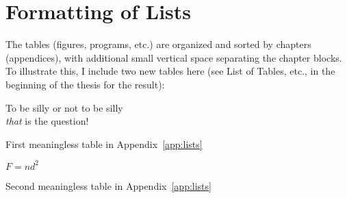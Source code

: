 \section{Formatting of Lists}

The tables (figures, programs, etc.) are organized and sorted by
chapters (appendices), with additional small vertical space separating
the chapter blocks. To illustrate this, I include two new tables here
(see List of Tables, etc., in the beginning of the thesis for the
result):
\begin{table}[htbp]
  \begin{center}
    To be silly or not to be silly\\
    \emph{that} is the question!
    \caption{First meaningless table in Appendix~\ref{app:lists}}
  \end{center}
\end{table}
%
\vspace*{-.3in}
\begin{table}[htbp]
  \begin{center}
    $F = nd^{2}$
    \caption{Second meaningless table in Appendix~\ref{app:lists}}
  \end{center}
\end{table}

